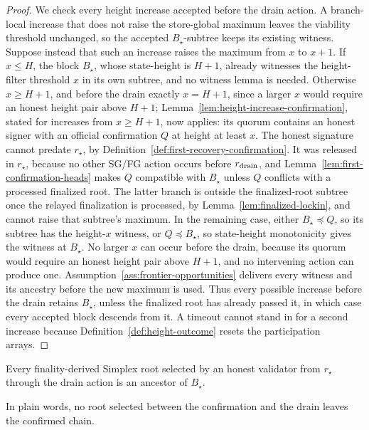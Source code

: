 \begin{proof}
We check every height increase accepted before the drain action.  A branch-local increase that does not raise the
store-global maximum leaves the viability threshold unchanged, so the accepted
\(B_\star\)-subtree keeps its existing witness.  Suppose instead that such an
increase raises the maximum
from \(x\) to \(x+1\).  If \(x\leq H\), the block \(B_\star\), whose
state-height is \(H+1\), already
witnesses the height-filter threshold \(x\) in its own subtree, and no
witness lemma is needed.  Otherwise \(x\geq H+1\), and before the drain
exactly \(x=H+1\), since a larger \(x\) would require an honest height
pair above \(H+1\); Lemma~\ref{lem:height-increase-confirmation},
stated for increases from \(x\geq H+1\), now applies: its quorum
contains an honest
signer with an official confirmation \(Q\) at height at least \(x\).
The honest signature cannot predate \(r_\star\), by
Definition~\ref{def:first-recovery-confirmation}.  It was released in
\(r_\star\), because no other SG/FG action occurs before
\(r_{\rm drain}\), and
Lemma~\ref{lem:first-confirmation-heads} makes \(Q\) compatible with
\(B_\star\) unless \(Q\) conflicts with a processed finalized root.  The latter branch is
outside the finalized-root subtree once the relayed finalization is
processed, by Lemma~\ref{lem:finalized-lockin}, and cannot raise that
subtree's maximum.  In the remaining case,
either \(B_\star\preceq Q\), so its subtree has
the height-\(x\) witness, or \(Q\preceq B_\star\), so state-height
monotonicity gives the witness at \(B_\star\).  No larger \(x\) can occur
before the drain, because its quorum would require an honest height pair
above \(H+1\), and no intervening action can produce one.
Assumption~\ref{ass:frontier-opportunities} delivers every witness and its
ancestry before the new maximum is used.  Thus every possible increase before
the drain retains \(B_\star\), unless the finalized root has already passed
it, in which case every accepted block descends from it.  A timeout cannot
stand in for a second increase because
Definition~\ref{def:height-outcome} resets the participation arrays.
\end{proof}

\begin{lemma}
\label{lem:predrain-simplex-roots}
Every finality-derived Simplex root selected by an honest validator from
\(r_\star\) through the drain action is an ancestor of \(B_\star\).

In plain words, no root selected between the confirmation and the drain
leaves the confirmed chain.
\end{lemma}


